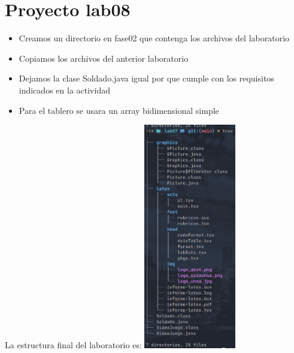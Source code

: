 \section{Proyecto lab08}
\begin{itemize}
  \item Creamos un directorio en fase02 que contenga los archivos del laboratorio
  \item Copiamos los archivos del anterior laboratorio
  \item Dejamos la clase Soldado.java igual por que cumple con los requisitos indicados en la actividad
  \item Para el tablero se usara un array bidimensional simple
\end{itemize}
La estructura final del laboratorio es: 
\includegraphics[width=0.3\textwidth]{img/tree.jpg}
